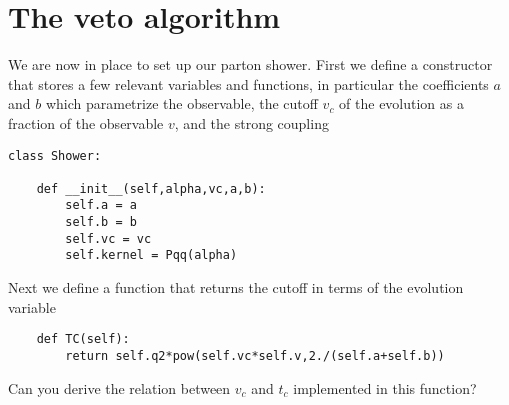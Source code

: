 \documentclass[10pt,fleqn]{scrartcl}
\begin{document}
\section{The veto algorithm}
We are now in place to set up our parton shower. First we define a constructor 
that stores a few relevant variables and functions, in particular the coefficients
$a$ and $b$ which parametrize the observable, the cutoff $v_c$ of the evolution 
as a fraction of the observable $v$, and the strong coupling
\begin{verbatim}
class Shower:

    def __init__(self,alpha,vc,a,b):
        self.a = a
        self.b = b
        self.vc = vc
        self.kernel = Pqq(alpha)
\end{verbatim}
Next we define a function that returns the cutoff in terms of the evolution variable
\begin{verbatim}
    def TC(self):
        return self.q2*pow(self.vc*self.v,2./(self.a+self.b))
\end{verbatim}
Can you derive the relation between $v_c$ and $t_c$ implemented in this function?
\end{document}
